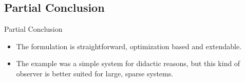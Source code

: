 
\subsection{Partial Conclusion}%
\label{subsec:fo-conclusion}

\begin{slide}{Partial Conclusion}
  \begin{itemize}
    \item The formulation is straightforward, optimization based and extendable.
    \item The example was a simple system for didactic reasons, but this kind of
          observer is better suited for large, sparse systems.
  \end{itemize}
\end{slide}
